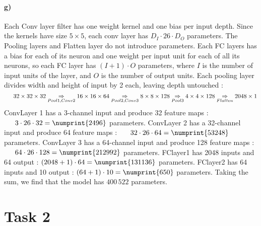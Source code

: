 \documentclass{article}
\begin{document}
		\paragraph{g)}
		Each Conv layer filter has one weight kernel and one bias per input depth. Since the kernels have size $5 \times 5$, each conv layer has $D_I \cdot 26 \cdot D_O$ parameters.\newline  
		The Pooling layers and Flatten layer do not introduce parameters. \newline
		Each FC layers has a bias for each of its neuron and one weight per input unit for each of all its neurons, so each FC layer has $ (I+1) \cdot O $ parameters, where $I$ is the number of input units of the layer, and $O$ is the number of output units. \newline
		Each pooling layer divides width and height of input by 2 each, leaving depth untouched :
		\[
			\indent 
			{32\times 32 \times 32}		\underset{Pool1, Conv2}{\Rightarrow}
		 	{16 \times 16 \times 64}	\underset{Pool2, Conv3}{\Rightarrow}
		    { 8 \times 8 \times 128}	\underset{Pool3}{\Rightarrow}
		    { 4 \times 4 \times 128}	\underset{Flatten}{\Rightarrow}
		    2048 \times 1
		 \]
		 ConvLayer 1 has a 3-channel input and produce 32 feature maps : \newline
		 $ \indent 3 \cdot 26 \cdot 32 = \numprint{2496}$ parameters. \newline
		 ConvLayer 2 has a 32-channel input and produce 64 feature maps : \newline
		 $ \indent 32 \cdot 26 \cdot 64 = \numprint{53248} $ parameters. \newline
		 ConvLayer 3 has a 64-channel input and produce 128 feature maps : \newline
		 $\indent 64 \cdot 26 \cdot 128 = \numprint{212992}$ parameters. \newline
		 FClayer1 has 2048 inputs and 64 output : 
		 $ (2048 + 1) \cdot 64 = \numprint{131136} $ parameters. \newline
		 FClayer2 has 64 inputs and 10 output : 
		 $ (64 + 1) \cdot 10 = \numprint{650}  $ parameters. \newline
		 Taking the sum, we find that the model has $400\,522$ parameters.
	\section*{Task 2}

	
\end{document}
